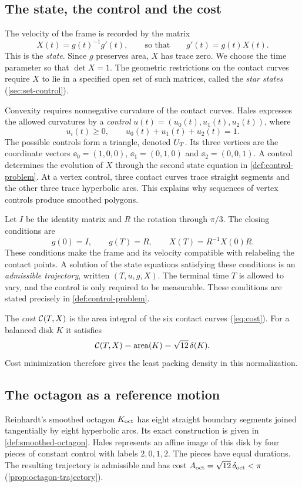 \subsection{The state, the control and the cost}\label{sec:setting-control}

The velocity of the frame is recorded by the matrix
\[
  X(t)=g(t)^{-1}g'(t),\qquad\text{so that}\qquad g'(t)=g(t)X(t).
\]
This is the \emph{state}. Since $g$ preserves area, $X$ has trace zero. We choose the time
parameter so that $\det X=1$. The geometric restrictions on the contact curves require $X$ to
lie in a specified open set of such matrices, called the \emph{star states}
(\cref{sec:set-control}).

Convexity requires nonnegative curvature of the contact curves. Hales expresses the allowed
curvatures by a \emph{control} $u(t)=(u_0(t),u_1(t),u_2(t))$, where
\[
  u_i(t)\ge0,\qquad u_0(t)+u_1(t)+u_2(t)=1.
\]
The possible controls form a triangle, denoted $U_{T}$. Its three vertices are the coordinate
vectors $\ee_0=(1,0,0)$, $\ee_1=(0,1,0)$ and $\ee_2=(0,0,1)$. A control determines the evolution
of $X$ through the second state equation in \cref{def:control-problem}. At a vertex control,
three contact curves trace straight segments and the other three trace hyperbolic arcs. This
explains why sequences of vertex controls produce smoothed polygons.

Let $I$ be the identity matrix and $R$ the rotation through $\pi/3$. The closing conditions are
\[
  g(0)=I,\qquad g(T)=R,\qquad X(T)=R^{-1}X(0)R.
\]
These conditions make the frame and its velocity compatible with relabeling the contact points. A solution
of the state equations satisfying these conditions is an \emph{admissible trajectory}, written
$(T,u,g,X)$. The terminal time $T$ is allowed to vary, and the control is only required to be
measurable. These conditions are stated precisely in \cref{def:control-problem}.

The \emph{cost} $\mathcal{C}(T,X)$ is the area integral of the six contact curves
(\cref{eq:cost}). For a balanced disk $K$ it satisfies
\[
  \mathcal{C}(T,X)=\operatorname{area}(K)=\sqrt{12}\,\delta(K).
\]
Cost minimization therefore gives the least packing density in this normalization.

\subsection{The octagon as a reference motion}\label{sec:setting-reference}

Reinhardt's smoothed octagon $K_{\mathrm{oct}}$ has eight straight boundary segments joined tangentially by
eight hyperbolic arcs. Its exact construction is given in \cref{def:smoothed-octagon}.
Hales represents an affine image of this disk by four pieces of constant control with labels
$2,0,1,2$. The pieces have equal durations. The resulting trajectory is admissible and has cost
$A_{\mathrm{oct}}=\sqrt{12}\,\delta_{\mathrm{oct}}<\pi$ (\cref{prop:octagon-trajectory}).

